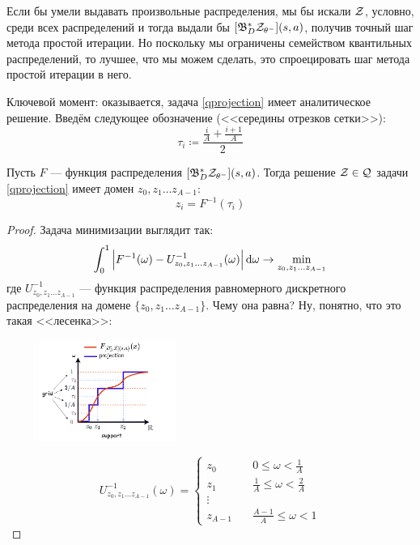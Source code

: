 Если бы умели выдавать произвольные распределения, мы бы искали $\mathcal{Z}$, условно, среди всех распределений и тогда выдали бы $[\mathfrak{B}^*_D \mathcal{Z}_{\theta^-}](s, a)$, получив точный шаг метода простой итерации. Но поскольку мы ограничены семейством квантильных распределений, то лучшее, что мы можем сделать, это спроецировать шаг метода простой итерации в него. 

Ключевой момент: оказывается, задача \eqref{qprojection} имеет аналитическое решение. Введём следующее обозначение (<<середины отрезков сетки>>):
$$\tau_i \coloneqq \frac{\frac{i}{A} + \frac{i + 1}{A}}{2}$$

\begin{theorem}
Пусть $F$ --- функция распределения $[\mathfrak{B}^*_D \mathcal{Z}_{\theta^-}](s, a)$. Тогда решение $\mathcal{Z} \in \mathcal{Q}$ задачи \eqref{qprojection} имеет домен $z_0, z_1 \dots z_{A-1}$:
$$z_i = F^{-1}(\tau_i)$$
\begin{proof}
Задача минимизации выглядит так:
\begin{equation}\label{Wassersteinminimization}
\int_0^1 \left| F^{-1}(\omega) - U^{-1}_{z_0, z_1 \dots z_{A-1}}(\omega) \right| \mathop{}\!\mathrm{d} \omega \to \min_{z_0, z_1 \dots z_{A-1}}
\end{equation}
где $ U^{-1}_{z_0, z_1 \dots z_{A-1}}$ --- функция распределения равномерного дискретного распределения на домене $\{z_0, z_1 \dots z_{A-1}\}$. Чему она равна? Ну, понятно, что это такая <<лесенка>>:

\begin{figure}
\vspace{-0.4cm}
\centering
\includegraphics[width=0.4\textwidth]{Images/quantileprojection.png}
\vspace{-1.8cm}
\end{figure}

$$U^{-1}_{z_0, z_1 \dots z_{A-1}}(\omega) = \begin{cases}
z_0 \quad &0 \le \omega < \frac{1}{A} \\
z_1 \quad &\frac{1}{A} \le \omega < \frac{2}{A} \\
\vdots \\
z_{A - 1} \quad &\frac{A - 1}{A} \le \omega < 1
\end{cases}$$


\end{proof}
\end{theorem}
